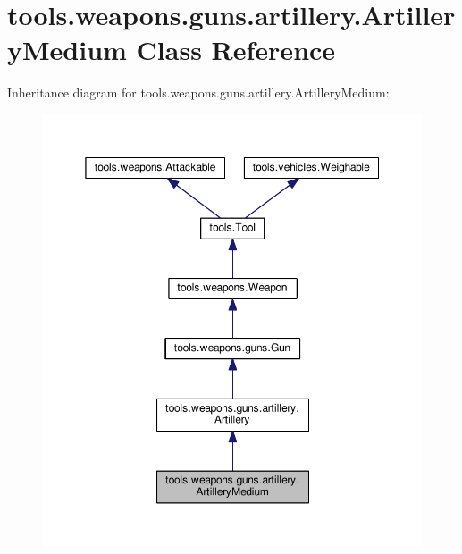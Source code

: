 \hypertarget{classtools_1_1weapons_1_1guns_1_1artillery_1_1_artillery_medium}{}\section{tools.\+weapons.\+guns.\+artillery.\+Artillery\+Medium Class Reference}
\label{classtools_1_1weapons_1_1guns_1_1artillery_1_1_artillery_medium}


Inheritance diagram for tools.\+weapons.\+guns.\+artillery.\+Artillery\+Medium\+:
\nopagebreak
\begin{figure}[H]
\begin{center}
\leavevmode
\includegraphics[width=350pt]{classtools_1_1weapons_1_1guns_1_1artillery_1_1_artillery_medium__inherit__graph}
\end{center}
\end{figure}



